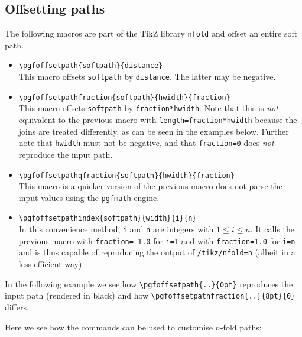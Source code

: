 \documentclass[12pt,a4paper]{article}
\theoremstyle{definition}
\newcommand{\nfold}{\texttt{nfold}}
\begin{document}
\subsection{Offsetting paths}
The following macros are part of the TikZ library \nfold{} and offset an entire soft path.
\begin{itemize}
  \item \verb|\pgfoffsetpath{softpath}{distance}|\\%
    This macro offsets \texttt{softpath} by \texttt{distance}. The latter may be negative.
  \item \verb|\pgfoffsetpathfraction{softpath}{hwidth}{fraction}|\\%
    This macro offsets \texttt{softpath} by \texttt{fraction*hwidth}. Note that this is \emph{not} equivalent to the previous macro with \texttt{length=fraction*hwidth} because the joins are treated differently, as can be seen in the examples below. Further note that \texttt{hwidth} must not be negative, and that \texttt{fraction=0} does \emph{not} reproduce the input path.
  \item \verb|\pgfoffsetpathqfraction{softpath}{hwidth}{fraction}|\\%
    This macro is a quicker version of the previous macro  does not parse the input values using the \texttt{pgfmath}-engine.
  \item \verb|\pgfoffsetpathindex{softpath}{width}{i}{n}|\\%
    In this convenience method, \texttt{i} and \texttt{n} are integers with $1 \leq i \leq n$. It calls the previous macro with \texttt{fraction=-1.0} for \texttt{i=1} and with \texttt{fraction=1.0} for \texttt{i=n} and is thus capable of reproducing the output of \texttt{/tikz/nfold=n} (albeit in a less efficient way).
\end{itemize}
In the following example we see how \verb|\pgfoffsetpath{..}{0pt}| reproduces the input path (rendered in black) and how \verb|\pgfoffsetpathfraction{..}{8pt}{0}| differs.
\begin{tkzexample}[latex=4cm]
\end{tkzexample}
Here we see how the commands can be used to customise $n$-fold paths:
\begin{tkzexample}[latex=4cm]
\end{tkzexample}
\end{document}
